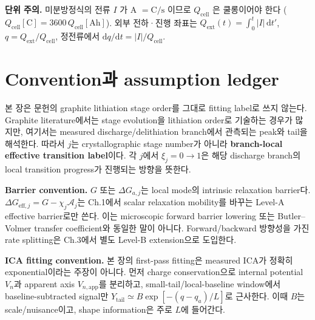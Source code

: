 \documentclass[11pt,a4paper]{article}
\newcommand{\dd}{\mathrm{d}}
\newcommand{\eff}{\mathrm{eff}}
\newcommand{\app}{\mathrm{app}}
\newcommand{\cell}{\mathrm{cell}}
\newcommand{\ext}{\mathrm{ext}}
\begin{document}
\textbf{단위 주의.} 미분방정식의 전류 $I$ 가 A $=\mathrm{C/s}$ 이므로 $Q_\cell$ 은 쿨롱이어야 한다
($Q_\cell[\mathrm C]=3600\,Q_\cell[\mathrm{Ah}]$). 외부 전하·진행 좌표는 $Q_\ext(t)=\int_0^t|I|\,\dd t'$,
$q=Q_\ext/Q_\cell$, 정전류에서 $\dd q/\dd t=|I|/Q_\cell$.

\section{Convention과 assumption ledger}\label{sec:convention}
본 장은 문헌의 graphite lithiation stage order를 그대로 fitting label로 쓰지 않는다. Graphite literature에서는
stage evolution을 lithiation order로 기술하는 경우가 많지만, 여기서는 measured discharge/delithiation branch에서 관측되는
peak와 tail을 해석한다. 따라서 $j$는 crystallographic stage number가 아니라 \textbf{branch-local effective transition label}이다.
각 $j$에서 $\xi_j=0\to1$은 해당 discharge branch의 local transition progress가 진행되는 방향을 뜻한다.

\textbf{Barrier convention.} $G$ 또는 $\Delta G_{a,j}$는 local mode의 intrinsic relaxation barrier다.
$\Delta G_{\eff,j}=G-\chi_j\mathcal A_j$는 Ch.1에서 scalar relaxation mobility를 바꾸는 Level-A effective barrier로만 쓴다.
이는 microscopic forward barrier lowering 또는 Butler--Volmer transfer coefficient와 동일한 말이 아니다. Forward/backward 방향성을
가진 rate splitting은 Ch.3에서 별도 Level-B extension으로 도입한다.

\textbf{ICA fitting convention.} 본 장의 first-pass fitting은 measured ICA가 정확히 exponential이라는 주장이 아니다.
먼저 charge conservation으로 internal potential $V_n$과 apparent axis $V_{n,\app}$를 분리하고, small-tail/local-baseline window에서
baseline-subtracted signal만 $Y_{\mathrm{tail}}\simeq B\exp[-(q-q_a)/L]$로 근사한다. 이때 $B$는 scale/nuisance이고, shape information은
주로 $L$에 들어간다.
\end{document}
